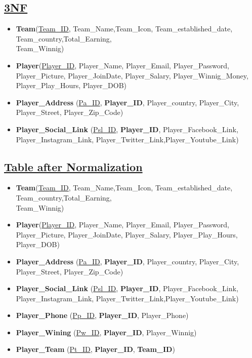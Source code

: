 \subsection*{\underline{3NF}}
\begin{itemize}
    \item \textbf{Team}(\underline{Team\_ID}, Team\_Name,Team\_Icon, Team\_established\_date, Team\_country,Total\_Earning,\\Team\_Winnig)
    \item \textbf{Player}(\underline{Player\_ID}, Player\_Name, Player\_Email, Player\_Password, Player\_Picture, Player\_JoinDate, Player\_Salary, Player\_Winnig\_Money, Player\_Play\_Hours, Player\_DOB)
    \item \textbf{Player\_Address} (\underline{Pa\_ID}, \textbf{Player\_ID}, Player\_country, Player\_City, Player\_Street, Player\_Zip\_Code)
    \item \textbf{Player\_Social\_Link} (\underline{Psl\_ID}, \textbf{Player\_ID}, Player\_Facebook\_Link, Player\_Instagram\_Link, Player\_Twitter\_Link,Player\_Youtube\_Link)

\end{itemize}

\subsection*{\underline{Table after Normalization}}
\begin{itemize}
    \item \textbf{Team}(\underline{Team\_ID}, Team\_Name,Team\_Icon, Team\_established\_date, Team\_country,Total\_Earning,\\Team\_Winnig)
    \item \textbf{Player}(\underline{Player\_ID}, Player\_Name, Player\_Email, Player\_Password, Player\_Picture, Player\_JoinDate, Player\_Salary, Player\_Play\_Hours, Player\_DOB)
    \item \textbf{Player\_Address} (\underline{Pa\_ID}, \textbf{Player\_ID}, Player\_country, Player\_City, Player\_Street, Player\_Zip\_Code)
    \item \textbf{Player\_Social\_Link} (\underline{Psl\_ID}, \textbf{Player\_ID}, Player\_Facebook\_Link, Player\_Instagram\_Link, Player\_Twitter\_Link,Player\_Youtube\_Link)
    \item \textbf{Player\_Phone} (\underline{Pp\_ID}, \textbf{Player\_ID}, Player\_Phone)
    \item \textbf{Player\_Wining} (\underline{Pw\_ID}, \textbf{Player\_ID}, Player\_Winnig)
    \item \textbf{Player\_Team} (\underline{Pt\_ID}, \textbf{Player\_ID}, \textbf{Team\_ID})
\end{itemize}


\clearpage

